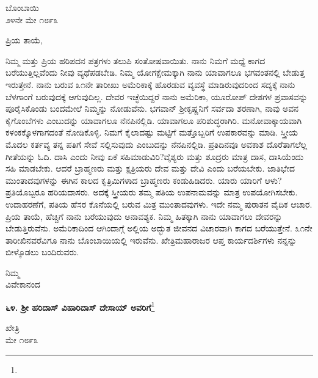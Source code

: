 \vspace{-0.75cm}

\begin{flushright}
ಬೊಂಬಾಯಿ\\೨೪ನೇ ಮೇ ೧೮೯೩
\end{flushright}
\vspace{-0.5cm}

\noindent
ಪ್ರಿಯ ತಾಯೆ,

ನಿಮ್ಮ ಮತ್ತು ಪ್ರಿಯ ಹರಿಪದನ ಪತ್ರಗಳು ತಲುಪಿ ಸಂತೋಷವಾಯಿತು. ನಾನು ನಿಮಗೆ ಮಧ್ಯೆ ಕಾಗದ ಬರೆಯುತ್ತಿಲ್ಲವೆಂದು ನೀವು ವ್ಯಥೆಪಡಬೇಡಿ. ನಿಮ್ಮ ಯೋಗಕ್ಷೇಮಕ್ಕಾಗಿ ನಾನು ಯಾವಾಗಲೂ ಭಗವಂತನಲ್ಲಿ ಬೇಡುತ್ತ ಇರುತ್ತೇನೆ. ನಾನು ಬರುವ ೩೧ನೇ ತಾರೀಖು ಅಮೆರಿಕಾಕ್ಕೆ ಹೊರಡುವ ವ್ಯವಸ್ಥೆ ಮಾಡಿರುವುದರಿಂದ ಸದ್ಯಕ್ಕೆ ನಾನು ಬೆಳಗಾಂಗೆ ಬರುವುದಕ್ಕೆ ಆಗುವುದಿಲ್ಲ. ದೇವರ ಇಚ್ಛೆಯಿದ್ದರೆ ನಾನು ಅಮೆರಿಕಾ, ಯೂರೋಪ್ ದೇಶಗಳ ಪ್ರವಾಸವನ್ನು ಪೂರೈಸಿಕೊಂಡು ಬಂದಮೇಲೆ ನಿಮ್ಮನ್ನು ನೋಡುವೆನು. ಭಗವಾನ್ ಶ‍್ರೀಕೃಷ್ಣನಿಗೆ ಸರ್ವದಾ ಶರಣಾಗಿ, ನಾವು ಅವನ ಕೈಗೊಂಬೆಗಳು ಎಂಬುದನ್ನು ಯಾವಾಗಲೂ ನೆನಪಿನಲ್ಲಿಡಿ. ಯಾವಾಗಲೂ ಪರಿಶುದ್ಧರಾಗಿರಿ. ಮನೋವಾಕ್ಕಾಯವಾಗಿ ಕಳಂಕಕ್ಕೊಳಗಾಗದಂತೆ ನೋಡಿಕೊಳ್ಳಿ. ನಿಮಗೆ ಕೈಲಾದಷ್ಟು ಮಟ್ಟಿಗೆ ಮತ್ತೊಬ್ಬರಿಗೆ ಉಪಕಾರವನ್ನು ಮಾಡಿ. ಸ್ತ್ರೀಯ ಮೊದಲ ಕರ್ತವ್ಯ ತನ್ನ ಪತಿಗೆ ಸೇವೆ ಸಲ್ಲಿಸುವುದು ಎಂಬುದನ್ನು ನೆನಪಿನಲ್ಲಿಡಿ. ಪ್ರತಿದಿನವೂ ಅವಕಾಶ ದೊರೆತಾಗಲೆಲ್ಲ ಗೀತೆಯನ್ನು ಓದಿ. ದಾಸಿ ಎಂದು ನೀವು ಏಕೆ ಸಹಿಮಾಡುವಿರಿ?ವೈಶ್ಯರು ಮತ್ತು ಶೂದ್ರರು ಮಾತ್ರ ದಾಸ, ದಾಸಿಯೆಂದು ಸಹಿ ಮಾಡಬೇಕು. ಆದರೆ ಬ್ರಾಹ್ಮಣರು ಮತ್ತು ಕ್ಷತ್ರಿಯರು ದೇವ ಮತ್ತು ದೇವಿ ಎಂದು ಬರೆಯಬೇಕು. ಜಾತಿಭೇದ ಮುಂತಾದವುಗಳನ್ನು ಈಗಿನ ಕಾಲದ ಕೃತ್ರಿಮಿಗಳಾದ ಬ್ರಾಹ್ಮಣರು ಕಂಡುಹಿಡಿದರು. ಯಾರು ಯಾರಿಗೆ ಆಳು? ಪ್ರತಿಯೊಬ್ಬರೂ ಹರಿಯದಾಸರು. ಅದಕ್ಕೆ ಸ್ತ್ರೀಯರು ತಮ್ಮ ಪತಿಯ ಉಪನಾಮವನ್ನು ಮಾತ್ರ ಉಪಯೋಗಿಸಬೇಕು. ಉದಾಹರಣೆಗೆ, ಪತಿಯ ಹೆಸರ ಕೊನೆಯಲ್ಲಿ ಬರುವ ಮಿತ್ರ ಮುಂತಾದವುಗಳು. ಇದೇ ನಮ್ಮ ಪುರಾತನ ವೈದಿಕ ಆಚಾರ. ಪ್ರಿಯ ತಾಯೆ, ಹೆಚ್ಚಿಗೆ ನಾನು ಬರೆಯುವುದು ಅನಾವಶ್ಯಕ. ನಿಮ್ಮ ಹಿತಕ್ಕಾಗಿ ನಾನು ಯಾವಾಗಲು ದೇವರನ್ನು ಬೇಡುತ್ತಿರುವೆನು. ಅಮೆರಿಕಾದಿಂದ ಆಗಿಂದಾಗ್ಗೆ ಅಲ್ಲಿಯ ಅದ್ಭುತ ಜೀವನದ ವಿಚಾರವಾಗಿ ಕಾಗದ ಬರೆಯುತ್ತೇನೆ. ೩೧ನೇ ತಾರೀಖಿನವರೆವಿಗೂ ನಾನು ಬೊಂಬಾಯಿಯಲ್ಲಿ ಇರುವೆನು. ಖೇತ್ರಿಮಹಾರಾಜರ ಆಪ್ತ ಕಾರ್ಯದರ್ಶಿಗಳು ನನ್ನನ್ನು ಬೀಳ್ಕೊಡಲು ಬಂದಿರುವರು.

\vspace{-0.55cm}

{\flushright
ನಿಮ್ಮ\\ವಿವೇಕಾನಂದ\par}
\vspace{-0.3cm}

\begin{center}
\textbf{೬೪. ಶ‍್ರೀ ಹರಿದಾಸ್ ವಿಹಾರಿದಾಸ್ ದೇಸಾಯ್ ಅವರಿಗೆ}\footnote{}
\end{center}
\vspace{-0.6cm}

\begin{flushright}
ಖೇತ್ರಿ\\ಮೇ ೧೮೯೩
\end{flushright}

